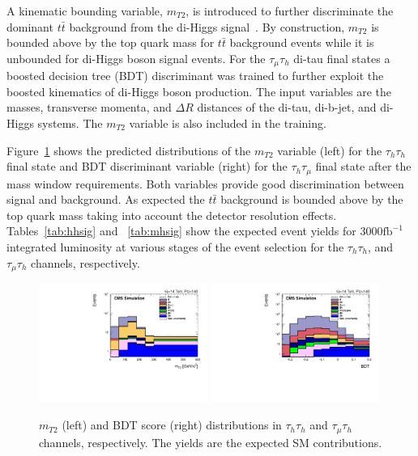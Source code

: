 A kinematic bounding variable, $m_{T2}$, is introduced to further
discriminate the dominant $t\bar{t}$ background from the di-Higgs signal~\cite{smt}. By construction, $m_{T2}$ is 
bounded above by the top quark mass for $t\bar{t}$ background events
while it is unbounded for di-Higgs boson signal events. For the
$\tau_{\mu}\tau_{h}$ di-tau final states a boosted decision tree (BDT) discriminant was trained to further exploit the boosted kinematics of di-Higgs boson
production. The input variables are the masses, transverse momenta,
and $\Delta R$ distances of the di-tau, di-b-jet, and di-Higgs
systems. The $m_{T2}$ variable is also included in the
training.

Figure~\ref{fig:bdtout} shows the predicted distributions of the $m_{T2}$ variable (left) for the $\tau_{h}\tau_{h}$ final state and BDT discriminant variable (right) for the $\tau_{h}\tau_{\mu}$ final state after the mass window requirements. Both variables provide good discrimination between signal and background. As expected the $t\bar{t}$ background is bounded above by the top quark mass taking into account the detector resolution effects. Tables~\ref{tab:hhsig} and ~\ref{tab:mhsig} show the expected event yields for $3000 \mathrm{fb}^{-1}$ integrated luminosity at various stages of the event selection for the $\tau_{h}\tau_{h}$, and $\tau_{\mu}\tau_{h}$ channels, respectively. 

\begin{figure}[hbtp]
\begin{center}
\includegraphics[width=0.49\textwidth]{figures_chapter6/thth_mt2.pdf}   
\includegraphics[width=0.49\textwidth]{figures_chapter6/tmth_bdt.pdf}
\caption{$m_{T2}$ (left) and BDT score (right) distributions in  $\tau_{h}\tau_{h}$ and  $\tau_{\mu}\tau_{h}$ channels, respectively. The yields are the expected SM 
contributions.}
\label{fig:bdtout}
\end{center}
\end{figure}

